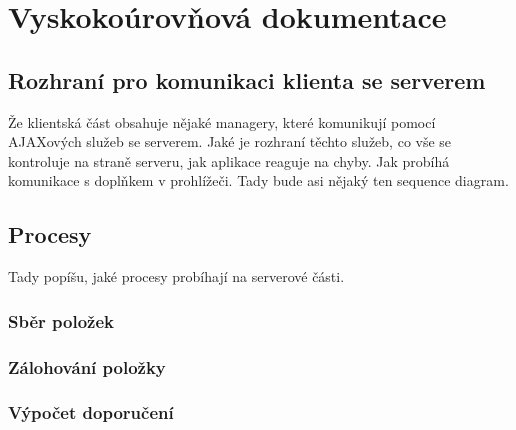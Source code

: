 \chapter{Vyskokoúrovňová dokumentace}

\section{Rozhraní pro komunikaci klienta se serverem}

Že klientská část obsahuje nějaké managery, které komunikují pomocí AJAXových služeb se serverem.
Jaké je rozhraní těchto služeb, co vše se kontroluje na straně serveru, jak aplikace reaguje na chyby.
Jak probíhá komunikace s doplňkem v prohlížeči.
Tady bude asi nějaký ten sequence diagram.

\section{Procesy}

Tady popíšu, jaké procesy probíhají na serverové části.

\subsection{Sběr položek}

\subsection{Zálohování položky}

\subsection{Výpočet doporučení}

